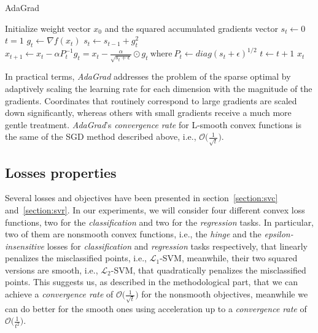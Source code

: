 \begin{algorithm}[H]
	\caption{AdaGrad}
	\label{alg:adagrad}
	\begin{algorithmic}
			\State Initialize weight vector $x_0$ and the squared accumulated gradients vector $s_t \gets 0$
			\State $t = 1$
				\State $g_t \gets \nabla f(x_t)$
				\State $s_t \gets s_{t-1} + g_t^2$
				\State $x_{t+1} \gets x_t - \alpha P_t^{-1} g_t = x_t - \displaystyle \frac{\alpha}{\sqrt{s_t + \epsilon}} \odot g_t \ \text{where} \ P_t \gets diag(s_t + \epsilon)^{1/2}$
				\State $t \gets t + 1$
			\EndWhile
			\State \Return $x_t$
		\EndFunction
	\end{algorithmic}
\end{algorithm}

In practical terms, \emph{AdaGrad} addresses the problem of the sparse optimal by adaptively scaling the learning rate for each dimension with the magnitude of the gradients. Coordinates that routinely correspond to large gradients are scaled down significantly, whereas others with small gradients receive a much more gentle treatment. \emph{AdaGrad}'s \emph{convergence rate} for L-smooth convex functions is the same of the SGD method described above, i.e., $\displaystyle \mathcal{O}\Big(\frac{1}{\sqrt{t}}\Big)$.


\subsection{Losses properties}

Several losses and objectives have been presented in section~\ref{section:svc} and~\ref{section:svr}. In our experiments, we will consider four different convex loss functions, two for the \emph{classification} and two for the \emph{regression} tasks. In particular, two of them are nonsmooth convex functions, i.e., the \emph{hinge} and the \emph{epsilon-insensitive} losses for \emph{classification} and \emph{regression} tasks respectively, that linearly penalizes the misclassified points, i.e., $\mathcal{L}_1$-SVM, meanwhile, their two squared versions are smooth, i.e., $\mathcal{L}_2$-SVM, that quadratically penalizes the misclassified points. This suggests us, as described in the methodological part, that we can achieve a \emph{convergence rate} of $\displaystyle \mathcal{O}\Big(\frac{1}{\sqrt{t}}\Big)$ for the nonsmooth objectives, meanwhile we can do better for the smooth ones using acceleration up to a \emph{convergence rate} of $\displaystyle \mathcal{O}\Big(\frac{1}{t^2}\Big)$.

